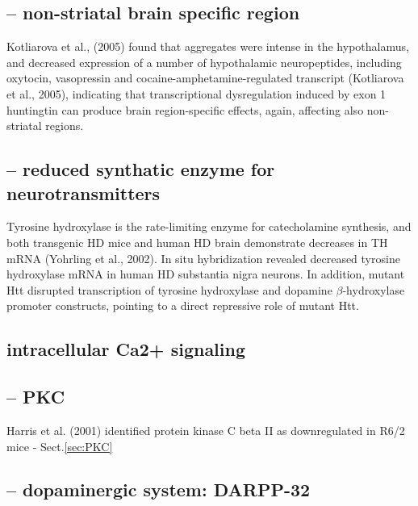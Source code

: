 \subsection{-- non-striatal brain specific region}

Kotliarova et al., (2005) found that aggregates were intense in the
hypothalamus, and decreased expression of a number of hypothalamic
neuropeptides, including oxytocin, vasopressin and cocaine-amphetamine-regulated
transcript (Kotliarova et al., 2005), indicating that transcriptional
dysregulation induced by exon 1 huntingtin can produce brain region-specific
effects, again, affecting also non-striatal regions.


\subsection{-- reduced synthatic enzyme for neurotransmitters}

Tyrosine hydroxylase is the rate-limiting enzyme for catecholamine synthesis,
and both transgenic HD mice and human HD brain demonstrate decreases in TH mRNA
(Yohrling et al., 2002). In situ hybridization revealed decreased tyrosine
hydroxylase mRNA in human HD substantia nigra neurons. In addition, mutant Htt
disrupted transcription of tyrosine hydroxylase and dopamine $\beta$-hydroxylase
promoter constructs, pointing to a direct repressive role of mutant Htt.

\subsection{intracellular Ca2+ signaling}

\subsection{-- PKC}

Harris et al. (2001) identified protein kinase C beta II as downregulated in
R6/2 mice - Sect.\ref{sec:PKC}

\subsection{-- dopaminergic system: DARPP-32}

